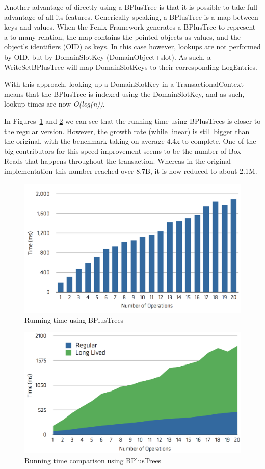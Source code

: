 \documentclass{llncs}
\begin{document}
Another advantage of directly using a BPlusTree is that it is possible
to take full advantage of all its features. Generically speaking, a
BPlusTree is a map between keys and values. When the Fenix Framework
generates a BPlusTree to represent a to-many relation, the map
contains the pointed objects as values, and the object's identifiers
(OID) as keys. In this case however, lookups are not performed by OID,
but by DomainSlotKey (DomainObject+slot). As such, a WriteSetBPlusTree
will map DomainSlotKeys to their corresponding LogEntries.

With this approach, looking up a DomainSlotKey in a
TransactionalContext means that the BPlusTree is indexed using the
DomainSlotKey, and as such, lookup times are now {\it O(log(n))}.

In Figures~\ref{fig:runtimeBPlus} and \ref{fig:comparisonBPlus} we can
see that the running time using BPlusTrees is closer to the regular
version. However, the growth rate (while linear) is still bigger than
the original, with the benchmark taking on average 4.4x to
complete. One of the big contributors for this speed improvement seems
to be the number of Box Reads that happens throughout the
transaction. Whereas in the original implementation this number
reached over 8.7B, it is now reduced to about 2.1M.

\begin{figure}
\centering
\includegraphics[width=0.9\linewidth]{time-long-bplus}
\caption{Running time using BPlusTrees}
\label{fig:runtimeBPlus}
\end{figure}

\begin{figure}
\centering
\includegraphics[width=0.9\linewidth]{comparison-bplus}
\caption{Running time comparison using BPlusTrees}
\label{fig:comparisonBPlus}
\end{figure}
\end{document}
